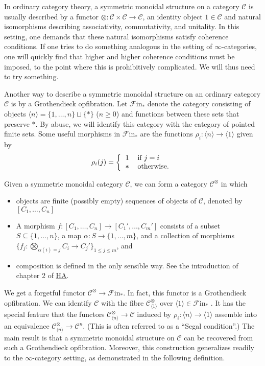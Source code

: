 \documentclass[letterpaper]{article}
\theoremstyle{definition}
\begin{document}
In ordinary category theory, a symmetric monoidal structure on a category $\mathcal{C}$ is usually described by a functor $\otimes : \mathcal{C} \times \mathcal{C} \to \mathcal{C}$, an identity object $1 \in \mathcal{C}$ and natural isomorphisms describing associativity, commutativity, and unitality. In this setting, one demands that these natural isomorphisms satisfy coherence conditions. If one tries to do something analogous in the setting of $\infty$-categories, one will quickly find that higher and higher coherence conditions must be imposed, to the point where this is prohibitively complicated. We will thus need to try something.

Another way to describe a symmetric monoidal structure on an ordinary category $\mathcal{C}$ is by a Grothendieck opfibration. Let $\mathscr{F}\mathrm{in}_*$ denote the category consisting of objects $\langle n \rangle = \{1, \ldots, n \} \sqcup \{*\}$ ($n \geq 0$) and functions between these sets that preserve $*$. By abuse, we will identify this category with the category of pointed finite sets. Some useful morphisms in $\mathscr{F}\mathrm{in}_*$ are the functions $\rho_i: \langle n \rangle \to \langle 1 \rangle$ given by
\[
    \rho_i(j) = \left\{
    \begin{tabular}{cl}
        $1$ & if $j=i$ \\
        $*$ & otherwise.
    \end{tabular}
    \right.
\]

Given a symmetric monoidal category $\mathcal{C}$, we can form a category $\mathcal{C}^\otimes$ in which
\begin{itemize}
    \item objects are finite (possibly empty) sequences of objects of $\mathcal{C}$, denoted by $[C_1, \ldots, C_n]$
    \item A morphism $f : [C_1, \ldots, C_n] \to [C_1', \ldots, C_m']$ consists of a subset $S \subseteq \{1, \ldots, n\}$, a map $\alpha : S \to \{1, \ldots, m\}$, and a collection of morphisms $\{f_j: \bigotimes_{\alpha(i)=j} C_i\to C_j'\}_{1 \leq j \leq m}$, and
    \item composition is defined in the only sensible way. See the introduction of chapter 2 of \href{References/LurieHigherAlgebra.pdf}{HA}.
\end{itemize}
We get a forgetful functor $\mathcal{C}^\otimes \to
\mathscr{F}\mathrm{in}_*$. In fact, this functor is a Grothendieck
opfibration. We can identify $\mathcal{C}$ with the fibre
$\mathcal{C}^\otimes_{\langle 1 \rangle}$ over $\langle 1 \rangle \in
\mathscr{F}\mathrm{in}_*$ . It has the special feature that the
functors $\mathcal{C}^\otimes_{\langle n \rangle} \to \mathcal{C}$
induced by $\rho_i : \langle n \rangle \to \langle 1 \rangle$ assemble
into an equivalence $\mathcal{C}^\otimes_{\langle n \rangle} \to
\mathcal{C}^n$. (This is often referred to as a ``Segal condition''.)
The main result is that a symmetric monoidal structure on
$\mathcal{C}$ can be recovered from such a Grothendieck
opfibration. Moreover, this construction generalizes readily to the
$\infty$-category setting, as demonstrated in the following
definition.
\end{document}
